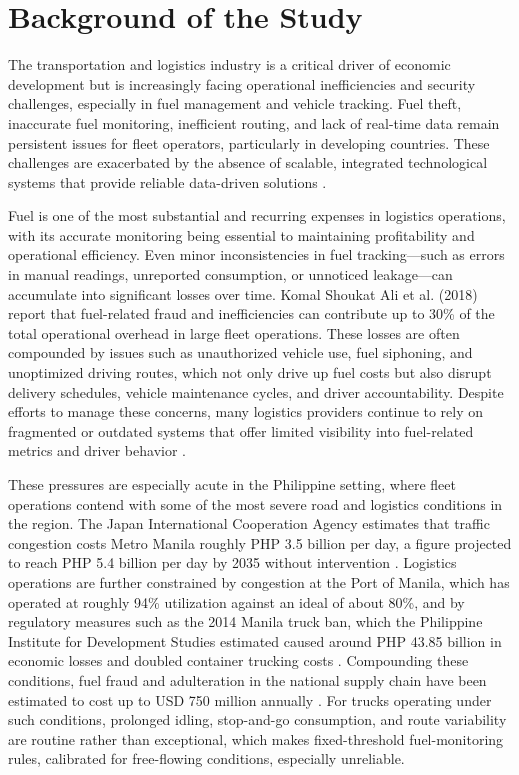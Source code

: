 
\section{Background of the Study}

The transportation and logistics industry is a critical driver of economic development but is increasingly facing operational inefficiencies and security challenges, especially in fuel management and vehicle tracking. Fuel theft, inaccurate fuel monitoring, inefficient routing, and lack of real-time data remain persistent issues for fleet operators, particularly in developing countries. These challenges are exacerbated by the absence of scalable, integrated technological systems that provide reliable data-driven solutions \cite{ahmed2017fuel, alquhali2019iot, crisgar2021gps}.

Fuel is one of the most substantial and recurring expenses in logistics operations, with its accurate monitoring being essential to maintaining profitability and operational efficiency. Even minor inconsistencies in fuel tracking—such as errors in manual readings, unreported consumption, or unnoticed leakage—can accumulate into significant losses over time. Komal Shoukat Ali et al. (2018) \cite{komal2018automatic} report that fuel-related fraud and inefficiencies can contribute up to 30\% of the total operational overhead in large fleet operations. These losses are often compounded by issues such as unauthorized vehicle use, fuel siphoning, and unoptimized driving routes, which not only drive up fuel costs but also disrupt delivery schedules, vehicle maintenance cycles, and driver accountability. Despite efforts to manage these concerns, many logistics providers continue to rely on fragmented or outdated systems that offer limited visibility into fuel-related metrics and driver behavior \cite{dhivyasri2015advanced, obikoya2014design}.

These pressures are especially acute in the Philippine setting, where fleet operations contend with some of the most severe road and logistics conditions in the region. The Japan International Cooperation Agency estimates that traffic congestion costs Metro Manila roughly PHP 3.5 billion per day, a figure projected to reach PHP 5.4 billion per day by 2035 without intervention \cite{jica2022metro_traffic,jica2025mmda_its}. Logistics operations are further constrained by congestion at the Port of Manila, which has operated at roughly 94\% utilization against an ideal of about 80\%, and by regulatory measures such as the 2014 Manila truck ban, which the Philippine Institute for Development Studies estimated caused around PHP 43.85 billion in economic losses and doubled container trucking costs \cite{patalinghug2015logistics,llanto2017truck_ban,patalinghug2015port_congestion}. Compounding these conditions, fuel fraud and adulteration in the national supply chain have been estimated to cost up to USD 750 million annually \cite{adb2016fuel_smuggling}. For trucks operating under such conditions, prolonged idling, stop-and-go consumption, and route variability are routine rather than exceptional, which makes fixed-threshold fuel-monitoring rules, calibrated for free-flowing conditions, especially unreliable.

